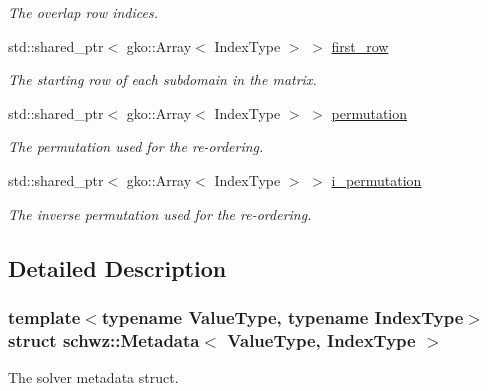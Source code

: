 \begin{DoxyCompactItemize}
\begin{DoxyCompactList}\small\item\em The overlap row indices. \end{DoxyCompactList}\item 
\mbox{\label{structschwz_1_1Metadata_a7720eefa9814e5a4db0d8705a1cf756f}} 
std\+::shared\+\_\+ptr$<$ gko\+::\+Array$<$ Index\+Type $>$ $>$ \hyperlink{structschwz_1_1Metadata_a7720eefa9814e5a4db0d8705a1cf756f}{first\+\_\+row}
\begin{DoxyCompactList}\small\item\em The starting row of each subdomain in the matrix. \end{DoxyCompactList}\item 
\mbox{\label{structschwz_1_1Metadata_af7361fcd600b3051619ce6e40770febc}} 
std\+::shared\+\_\+ptr$<$ gko\+::\+Array$<$ Index\+Type $>$ $>$ \hyperlink{structschwz_1_1Metadata_af7361fcd600b3051619ce6e40770febc}{permutation}
\begin{DoxyCompactList}\small\item\em The permutation used for the re-\/ordering. \end{DoxyCompactList}\item 
\mbox{\label{structschwz_1_1Metadata_a9ede19ac4f54b4161bed0a39bf7f5767}} 
std\+::shared\+\_\+ptr$<$ gko\+::\+Array$<$ Index\+Type $>$ $>$ \hyperlink{structschwz_1_1Metadata_a9ede19ac4f54b4161bed0a39bf7f5767}{i\+\_\+permutation}
\begin{DoxyCompactList}\small\item\em The inverse permutation used for the re-\/ordering. \end{DoxyCompactList}\end{DoxyCompactItemize}


\subsection{Detailed Description}
\subsubsection*{template$<$typename Value\+Type, typename Index\+Type$>$\newline
struct schwz\+::\+Metadata$<$ Value\+Type, Index\+Type $>$}

The solver metadata struct. 


